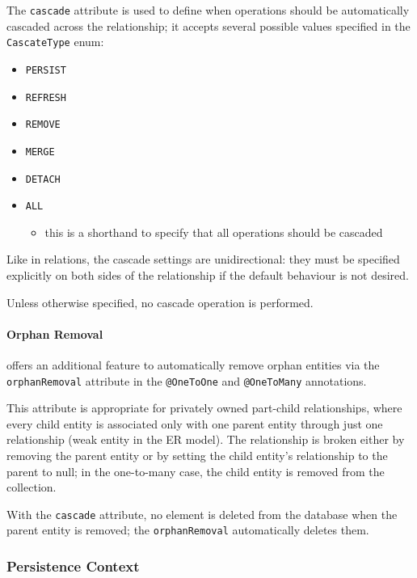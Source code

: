 \documentclass[english]{article}
\begin{document}
The \texttt{cascade} attribute is used to define when operations should be automatically cascaded across the relationship;
it accepts several possible values specified in the \texttt{CascateType} enum:

\begin{itemize}[label=\texttt{>}]
  \item \texttt{PERSIST}
  \item \texttt{REFRESH}
  \item \texttt{REMOVE}
  \item \texttt{MERGE}
  \item \texttt{DETACH}
  \item \texttt{ALL}
        \begin{itemize}[label=\(\rightarrow\)]
          \item this is a shorthand to specify that all operations should be cascaded
        \end{itemize}
\end{itemize}

Like in relations, the cascade settings are unidirectional: they must be specified explicitly on both sides of the relationship if the default behaviour is not desired.

Unless otherwise specified, no cascade operation is performed.

\paragraph{Orphan Removal}

\jpa offers an additional feature to automatically remove orphan entities via the \texttt{orphanRemoval} attribute in the \texttt{@OneToOne} and \texttt{@OneToMany} annotations.

This attribute is appropriate for privately owned part-child relationships, where every child entity is associated only with one parent entity through just one relationship (weak entity in the ER model).
The relationship is broken either by removing the parent entity or by setting the child entity's relationship to the parent to null;
in the one-to-many case, the child entity is removed from the collection.

With the \texttt{cascade} attribute, no element is deleted from the database when the parent entity is removed;
the \texttt{orphanRemoval} automatically deletes them.

\subsubsection{Persistence Context}
\end{document}
